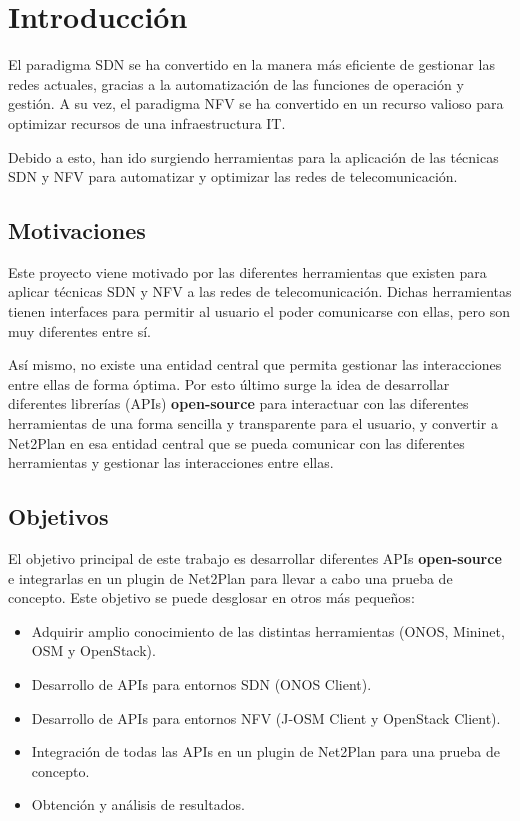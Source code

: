 \chapter{Introducción}

El paradigma SDN se ha convertido en la manera más eficiente de gestionar las redes actuales, gracias a la automatización de las funciones de operación y gestión. A su vez, el paradigma NFV se ha convertido en un recurso valioso para optimizar recursos de una infraestructura IT. 

Debido a esto, han ido surgiendo herramientas para la aplicación de las técnicas SDN y NFV para automatizar y optimizar las redes de telecomunicación.

\section{Motivaciones}

Este proyecto viene motivado por las diferentes herramientas que existen para aplicar técnicas SDN y NFV a las redes de telecomunicación. Dichas herramientas tienen interfaces para permitir al usuario el poder comunicarse con ellas, pero son muy diferentes entre sí. 

Así mismo, no existe una entidad central que permita gestionar las interacciones entre ellas de forma óptima. Por esto último surge la idea de desarrollar diferentes librerías (APIs) \textbf{open-source} para interactuar con las diferentes herramientas de una forma sencilla y transparente para el usuario, y convertir a Net2Plan en esa entidad central que se pueda comunicar con las diferentes herramientas y gestionar las interacciones entre ellas.

\section{Objetivos}

El objetivo principal de este trabajo es desarrollar diferentes APIs \textbf{open-source} e integrarlas en un plugin de Net2Plan para llevar a cabo una prueba de concepto. Este objetivo se puede desglosar en otros más pequeños:

\begin{itemize}
	\item Adquirir amplio conocimiento de las distintas herramientas (ONOS, Mininet, OSM y OpenStack). 
	\item Desarrollo de APIs para entornos SDN (ONOS Client).
	\item Desarrollo de APIs para entornos NFV (J-OSM Client y OpenStack Client).
	\item Integración de todas las APIs en un plugin de Net2Plan para una prueba de concepto.
	\item Obtención y análisis de resultados.
\end{itemize}


